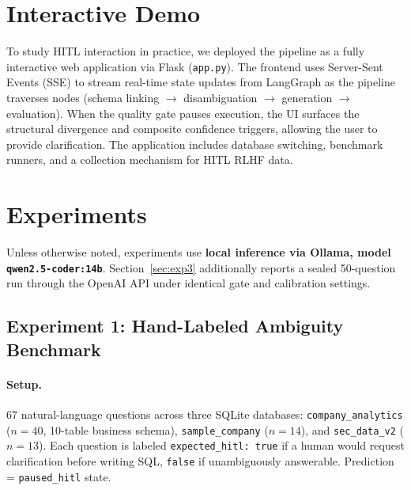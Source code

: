 \documentclass{article}
\begin{document}
\section{Interactive Demo}
\label{sec:demo}

To study HITL interaction in practice, we deployed the pipeline as a
fully interactive web application via Flask (\texttt{app.py}).
The frontend uses Server-Sent Events (SSE) to stream real-time state updates
from LangGraph as the pipeline traverses nodes (schema linking $\to$
disambiguation $\to$ generation $\to$ evaluation).
When the quality gate pauses execution, the UI surfaces the structural divergence
and composite confidence triggers, allowing the user to provide clarification.
The application includes database switching, benchmark runners, and a
collection mechanism for HITL RLHF data.

\section{Experiments}
\label{sec:experiments}

Unless otherwise noted, experiments use \textbf{local inference via Ollama,
model \texttt{qwen2.5-coder:14b}}.
Section~\ref{sec:exp3} additionally reports a sealed 50-question run through
the OpenAI API under identical gate and calibration settings.

\subsection{Experiment 1: Hand-Labeled Ambiguity Benchmark}
\label{sec:exp1}

\paragraph{Setup.}
67 natural-language questions across three SQLite databases:
\texttt{company\_analytics} ($n{=}40$, 10-table business schema),
\texttt{sample\_company} ($n{=}14$), and \texttt{sec\_data\_v2} ($n{=}13$).
Each question is labeled \texttt{expected\_hitl: true} if a human would
request clarification before writing SQL, \texttt{false} if unambiguously
answerable.
Prediction = \texttt{paused\_hitl} state.
\end{document}
